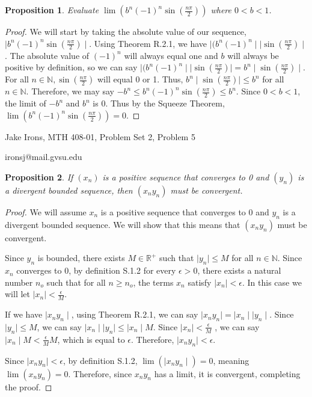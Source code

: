\documentclass[11 pt]{article}
\newtheorem{proposition}{Proposition}
\newcommand{\newpar}{\vspace{.15in}\noindent}
\begin{document}
\newpar
\begin{proposition}
Evaluate $\lim(b^n(-1)^n\sin(\frac{n\pi}{2}))$ where $0<b<1$.
\end{proposition}
\begin{proof}
\newpar 
We will start by taking the absolute value of our sequence, $\mid b^n(-1)^n\sin(\frac{n\pi}{2})\mid$. Using Theorem R.2.1, we have $\mid(b^n(-1)^n\mid\mid\sin(\frac{n\pi}{2})\mid$. The absolute value of $(-1)^n$ will always equal one and $b$ will always be positive by definition, so we can say $\mid(b^n(-1)^n\mid\mid\sin(\frac{n\pi}{2})\mid=b^n\mid\sin(\frac{n\pi}{2})\mid$. For all $n\in\mathbb{N}, \sin(\frac{n\pi}{2})$ will equal 0 or 1. Thus, $b^n\mid\sin(\frac{n\pi}{2})\mid\le b^n$ for all $n\in\mathbb{N}$. Therefore, we may say $-b^n\le b^n(-1)^n\sin(\frac{n\pi}{2})\le b^n$. Since $0<b<1$, the limit of $-b^n$ and $b^n$ is 0. Thus by the Squeeze Theorem, $\lim(b^n(-1)^n\sin(\frac{n\pi}{2}))=0$.
\end{proof}
\newpage
\noindent Jake Irons, MTH 408-01, Problem Set 2, Problem 5

\noindent ironsj@mail.gvsu.edu
\newpar
\begin{proposition}
 If $(x_n)$ is a positive sequence that converges to 0 and $(y_n)$ is a divergent bounded sequence, then $(x_ny_n)$ must be convergent.
\end{proposition}
\begin{proof}
We will assume $x_n$ is a positive sequence that converges to 0 and $y_n$ is a divergent bounded sequence. We will show that this means that $(x_ny_n)$ must be convergent. 

\newpar
Since $y_n$ is bounded, there exists $M\in\mathbb{R}^+$ such that $\mid y_n\mid\le M$ for all $n\in\mathbb{N}$. Since $x_n$ converges to 0, by definition S.1.2 for every $\epsilon>0$, there exists a natural number $n_o$ such that for all $n\ge n_o$, the terms $x_n$ satisfy $\mid x_n\mid<\epsilon$. In this case we will let $\mid x_n\mid<\frac{\epsilon}{M}$. 

\newpar
If we have $\mid x_ny_n\mid$, using Theorem R.2.1, we can say $\mid x_ny_n\mid=\mid x_n\mid\mid y_n\mid$. Since $\mid y_n\mid\le M$, we can say $\mid x_n\mid\mid y_n\mid\le\mid x_n\mid M$. Since $\mid x_n\mid<\frac{\epsilon}{M}$ , we can say $\mid x_n\mid M<\frac{\epsilon}{M}M$, which is equal to $\epsilon$. Therefore, $\mid x_ny_n\mid<\epsilon$.

\newpar
Since $\mid x_ny_n\mid<\epsilon$, by definition S.1.2, $\lim(\mid x_ny_n\mid)=0$, meaning $\lim(x_ny_n)=0$. Therefore, since $x_ny_n$ has a limit, it is convergent, completing the proof. 


\end{proof}
\end{document}
